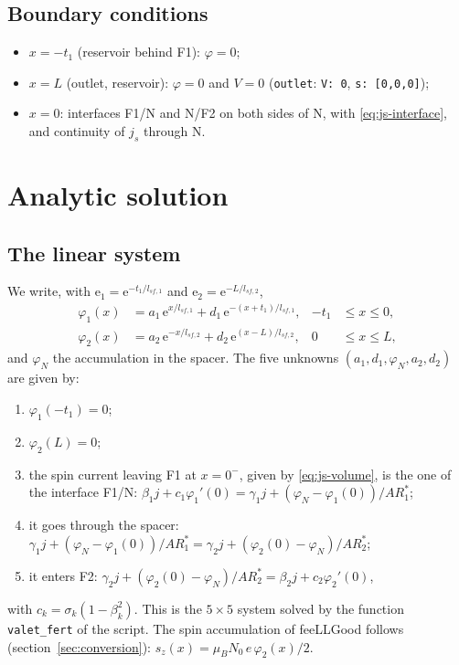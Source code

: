 \documentclass[11pt,a4paper]{article}
\newcommand{\ee}{\mathrm{e}}
\begin{document}
\subsection{Boundary conditions}

\begin{itemize}
  \item $x = -t_1$ (reservoir behind F1): $\varphi = 0$;
  \item $x = L$ (outlet, reservoir): $\varphi = 0$ and $V = 0$
    (\texttt{outlet}: \texttt{V: 0}, \texttt{s: [0,0,0]});
  \item $x = 0$: interfaces F1/N and N/F2 on both sides of N, with
    \eqref{eq:js-interface}, and continuity of $j_s$ through N.
\end{itemize}

\section{Analytic solution}
\label{sec:analytic}

\subsection{The linear system}

We write, with $\ee_1 = \ee^{-t_1/l_{sf,1}}$ and $\ee_2 = \ee^{-L/l_{sf,2}}$,
\begin{align}
  \varphi_1(x) &= a_1\,\ee^{x/l_{sf,1}} + d_1\,\ee^{-(x+t_1)/l_{sf,1}},
    & -t_1 &\le x\le 0, \\
  \varphi_2(x) &= a_2\,\ee^{-x/l_{sf,2}} + d_2\,\ee^{(x-L)/l_{sf,2}},
    & 0 &\le x\le L,
\end{align}
and $\varphi_N$ the accumulation in the spacer. The five unknowns
$(a_1, d_1, \varphi_N, a_2, d_2)$ are given by:
\begin{enumerate}
  \item $\varphi_1(-t_1) = 0$;
  \item $\varphi_2(L) = 0$;
  \item the spin current leaving F1 at $x=0^-$, given by
    \eqref{eq:js-volume}, is the one of the interface F1/N:
    $\beta_1 j + c_1\varphi_1'(0) = \gamma_1 j + (\varphi_N-\varphi_1(0))/AR_1^*$;
  \item it goes through the spacer:
    $\gamma_1 j + (\varphi_N-\varphi_1(0))/AR_1^* =
     \gamma_2 j + (\varphi_2(0)-\varphi_N)/AR_2^*$;
  \item it enters F2:
    $\gamma_2 j + (\varphi_2(0)-\varphi_N)/AR_2^* = \beta_2 j + c_2\varphi_2'(0)$,
\end{enumerate}
with $c_k = \sigma_k(1-\beta_k^2)$. This is the $5\times5$ system solved by
the function \texttt{valet\_fert} of the script. The spin accumulation of
feeLLGood follows (section~\ref{sec:conversion}):
$s_z(x) = \mu_B N_0\,e\,\varphi_2(x)/2$.
\end{document}
